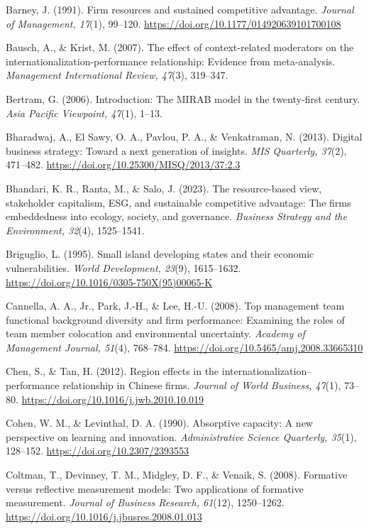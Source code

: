 \documentclass[12pt,a4paper]{article}
\begin{document}
Barney, J. (1991). Firm resources and sustained competitive advantage.
\emph{Journal of Management, 17}(1), 99--120.
\url{https://doi.org/10.1177/014920639101700108}

Bausch, A., \& Krist, M. (2007). The effect of context-related
moderators on the internationalization-performance relationship:
Evidence from meta-analysis. \emph{Management International Review,
47}(3), 319--347.

Bertram, G. (2006). Introduction: The MIRAB model in the twenty-first
century. \emph{Asia Pacific Viewpoint, 47}(1), 1--13.

Bharadwaj, A., El Sawy, O. A., Pavlou, P. A., \& Venkatraman, N. (2013).
Digital business strategy: Toward a next generation of insights.
\emph{MIS Quarterly, 37}(2), 471--482.
\url{https://doi.org/10.25300/MISQ/2013/37:2.3}

Bhandari, K. R., Ranta, M., \& Salo, J. (2023). The resource-based view,
stakeholder capitalism, ESG, and sustainable competitive advantage: The
firm\textquotesingle s embeddedness into ecology, society, and
governance. \emph{Business Strategy and the Environment, 32}(4),
1525--1541.

Briguglio, L. (1995). Small island developing states and their economic
vulnerabilities. \emph{World Development, 23}(9), 1615--1632.
\url{https://doi.org/10.1016/0305-750X(95)00065-K}

Cannella, A. A., Jr., Park, J.-H., \& Lee, H.-U. (2008). Top management
team functional background diversity and firm performance: Examining the
roles of team member colocation and environmental uncertainty.
\emph{Academy of Management Journal, 51}(4), 768--784.
\url{https://doi.org/10.5465/amj.2008.33665310}

Chen, S., \& Tan, H. (2012). Region effects in the
internationalization--performance relationship in Chinese firms.
\emph{Journal of World Business, 47}(1), 73--80.
\url{https://doi.org/10.1016/j.jwb.2010.10.019}

Cohen, W. M., \& Levinthal, D. A. (1990). Absorptive capacity: A new
perspective on learning and innovation. \emph{Administrative Science
Quarterly, 35}(1), 128--152. \url{https://doi.org/10.2307/2393553}

Coltman, T., Devinney, T. M., Midgley, D. F., \& Venaik, S. (2008).
Formative versus reflective measurement models: Two applications of
formative measurement. \emph{Journal of Business Research, 61}(12),
1250--1262. \url{https://doi.org/10.1016/j.jbusres.2008.01.013}
\end{document}
